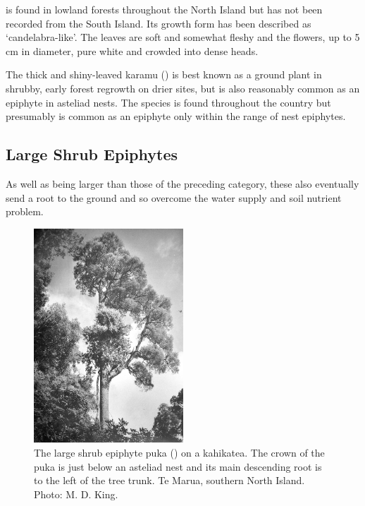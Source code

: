  is found in lowland forests throughout the North Island but has not been recorded from the South Island.
Its growth form has been described as `candelabra-like'.
The leaves are soft and somewhat fleshy and the flowers, up to 5 cm in diameter, pure white and crowded into dense heads.

The thick and shiny-leaved karamu () is best known as a ground plant in shrubby, early forest regrowth on drier sites, but is also reasonably common as an epiphyte in asteliad nests.
The species is found throughout the country but presumably is common as an epiphyte only within the range of nest epiphytes.

\subsection{Large Shrub Epiphytes}

As well as being larger than those of the preceding category, these also eventually send a root to the ground and so overcome the water supply and soil nutrient problem.

\begin{figure}
	\includegraphics[width=0.5\textwidth]{graphics/figure45puka.jpg}
	\centering
	\caption[The large shrub epiphyte puka]{The large shrub epiphyte puka () on a kahikatea.
	The crown of the puka is just below an asteliad nest and its main descending root is to the left of the tree trunk.
	Te Marua, southern North Island.
	Photo: M. D. King.}%
	\label{fig:45puka}
\end{figure}

